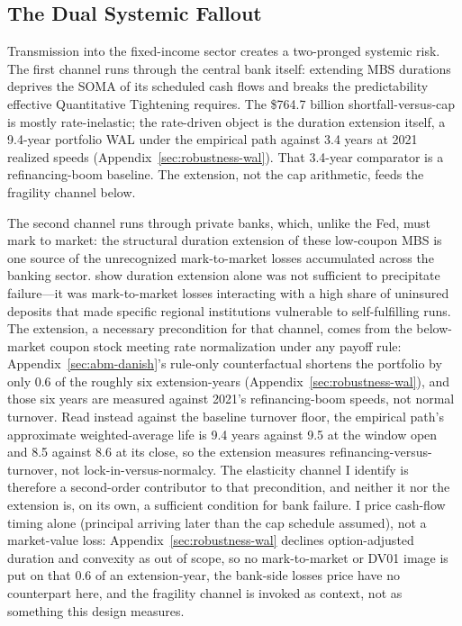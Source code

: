 \subsection{The Dual Systemic Fallout}\label{sec:discussion-fallout}

Transmission into the fixed-income sector creates a two-pronged systemic risk. The first channel runs through the central bank itself: extending MBS durations deprives the SOMA of its scheduled cash flows and breaks the predictability effective Quantitative Tightening requires. The \$764.7 billion shortfall-versus-cap is mostly rate-inelastic; the rate-driven object is the duration extension itself, a 9.4-year portfolio WAL under the empirical path against 3.4 years at 2021 realized speeds (Appendix~\ref{sec:robustness-wal}). That 3.4-year comparator is a refinancing-boom baseline. The extension, not the cap arithmetic, feeds the fragility channel below.

The second channel runs through private banks, which, unlike the Fed, must mark to market: the structural duration extension of these low-coupon MBS is one source of the unrecognized mark-to-market losses accumulated across the banking sector. \citet{jiang2023} show duration extension alone was not sufficient to precipitate failure---it was mark-to-market losses interacting with a high share of uninsured deposits that made specific regional institutions vulnerable to self-fulfilling runs. The extension, a necessary precondition for that channel, comes from the below-market coupon stock meeting rate normalization under any payoff rule: Appendix~\ref{sec:abm-danish}'s rule-only counterfactual shortens the portfolio by only 0.6 of the roughly six extension-years (Appendix~\ref{sec:robustness-wal}), and those six years are measured against 2021's refinancing-boom speeds, not normal turnover. Read instead against the baseline turnover floor, the empirical path's approximate weighted-average life is 9.4 years against 9.5 at the window open and 8.5 against 8.6 at its close, so the extension measures refinancing-versus-turnover, not lock-in-versus-normalcy. The elasticity channel I identify is therefore a second-order contributor to that precondition, and neither it nor the extension is, on its own, a sufficient condition for bank failure. I price cash-flow timing alone (principal arriving later than the cap schedule assumed), not a market-value loss: Appendix~\ref{sec:robustness-wal} declines option-adjusted duration and convexity as out of scope, so no mark-to-market or DV01 image is put on that 0.6 of an extension-year, the bank-side losses \citet{jiang2023} price have no counterpart here, and the fragility channel is invoked as context, not as something this design measures.

